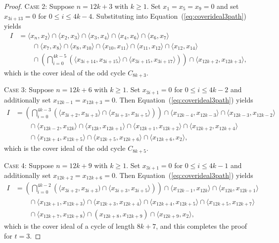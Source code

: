 \documentclass[12pt]{amsart}
\begin{document}
\begin{proof}
\medskip
\noindent
\textsc{Case 2}: Suppose $n=12k+3$ with $k\ge1$. Set $x_1=x_5=x_9=0$ and set $x_{3i+13}=0$ for $0\le i\le 4k-4$.
Substituting into Equation~(\ref{eq:coverideal3path}) yields
\[
\begin{aligned}
I
&= \langle x_n,x_2 \rangle \cap \langle x_2,x_3 \rangle \cap \langle x_3,x_4 \rangle
   \cap \langle x_4,x_6 \rangle \cap \langle x_6,x_7 \rangle \\
&\qquad \cap \langle x_7,x_8 \rangle \cap \langle x_8,x_{10} \rangle \cap \langle x_{10},x_{11} \rangle
   \cap \langle x_{11},x_{12} \rangle \cap \langle x_{12},x_{14} \rangle \\
&\qquad \cap
\left(\bigcap_{i=0}^{4k-5}
\left( \langle x_{3i+14},x_{3i+15} \rangle \cap \langle x_{3i+15},x_{3i+17} \rangle \right)\right)
\cap \langle x_{12k+2},x_{12k+3} \rangle,
\end{aligned}
\]
which is the cover ideal of the odd cycle $C_{8k+3}$.

\medskip
\noindent
\textsc{Case 3:} Suppose $n=12k+6$ with $k\ge1$. Set $x_{3i+1}=0$ for $0\le i\le 4k-2$ and additionally set $x_{12k-1}=x_{12k+3}=0$. Then Equation~(\ref{eq:coverideal3path}) yields
\[
\begin{aligned}
I
&= \left(\bigcap_{i=0}^{4k-3}
\left(\langle x_{3i+2},x_{3i+3} \rangle \cap \langle x_{3i+3},x_{3i+5} \rangle \right)\right)
\cap \langle x_{12k-4},x_{12k-3} \rangle \cap \langle x_{12k-3},x_{12k-2}\rangle \\
&\qquad \cap \langle x_{12k-2},x_{12k} \rangle \cap \langle x_{12k},x_{12k+1}\rangle
\cap \langle x_{12k+1},x_{12k+2} \rangle \cap \langle x_{12k+2},x_{12k+4} \rangle \\
&\qquad \cap \langle x_{12k+4},x_{12k+5} \rangle \cap \langle x_{12k+5},x_{12k+6} \rangle
\cap \langle x_{12k+6},x_2 \rangle,
\end{aligned}
\]
which is the cover ideal of the odd cycle $C_{8k+5}$.

\medskip
\noindent
\textsc{Case 4:} Suppose $n=12k+9$ with $k\ge1$. Set $x_{3i+1}=0$ for $0\le i\le 4k-1$ and additionally set $x_{12k+2}=x_{12k+6}=0$. Then Equation~(\ref{eq:coverideal3path}) yields
\[
\begin{aligned}
I
&= \left(\bigcap_{i=0}^{4k-2}
\left(\langle x_{3i+2},x_{3i+3}) \cap \langle x_{3i+3},x_{3i+5}\rangle\right)\right)
\cap \langle x_{12k-1},x_{12k} \rangle \cap \langle x_{12k},x_{12k+1} \rangle \\
&\qquad \cap \langle x_{12k+1},x_{12k+3} \rangle \cap \langle x_{12k+3},x_{12k+4}\rangle
\cap \langle x_{12k+4},x_{12k+5} \rangle \cap \langle x_{12k+5},x_{12k+7}\rangle \\
&\qquad \cap \langle x_{12k+7},x_{12k+8}\rangle \cap (x_{12k+8},x_{12k+9})
\cap \langle x_{12k+9},x_2 \rangle,
\end{aligned}
\]
which is the cover ideal of a cycle of length ${8k+7}$, and this completes the proof for $t=3$.


\end{proof}
\end{document}
